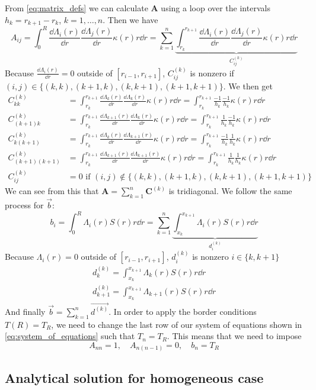 From \autoref{eq:matrix_defs} we can calculate \(\mathbf{A}\) using a loop over the intervals \(h_k = r_{k+1} - r_k\), \(k = 1, \dots, n\). Then we have
\begin{equation}
    A_{ij}
    = \int_0^R \frac{\dd \Lambda_i(r)}{\dd r} \frac{\dd \Lambda_j(r)}{\dd r} \kappa(r) r \dd r
    = \sum_{k=1}^n \underbrace{\int_{r_k}^{r_{k+1}} \frac{\dd \Lambda_i(r)}{\dd r} \frac{\dd \Lambda_j(r)}{\dd r} \kappa(r) r \dd r}_{C_{ij}^{(k)}}
\end{equation}
Because \(\frac{\dd \Lambda_i(r)}{\dd r} = 0\) outside of \([r_{i-1}, r_{i+1}]\), \(C^{(k)}_{ij}\) is nonzero if \((i,j) \in \{(k,k), (k+1,k), (k,k+1), (k+1,k+1)\}\). We then get
\begin{align*}
    C^{(k)}_{kk} &= \int_{r_{k}}^{r_{k+1}} \frac{\dd \Lambda_{k}(r)}{\dd r} \frac{\dd \Lambda_{k}(r)}{\dd r} \kappa(r) r \dd r = \int_{r_{k}}^{r_{k+1}} \frac{-1}{h_k} \frac{-1}{h_k} \kappa(r) r \dd r \\
    C^{(k)}_{(k+1)k} &= \int_{r_{k}}^{r_{k+1}} \frac{\dd \Lambda_{k+1}(r)}{\dd r} \frac{\dd \Lambda_{k}(r)}{\dd r} \kappa(r) r \dd r = \int_{r_{k}}^{r_{k+1}} \frac{1}{h_k} \frac{-1}{h_k} \kappa(r) r \dd r \\
    C^{(k)}_{k(k+1)} &= \int_{r_{k}}^{r_{k+1}} \frac{\dd \Lambda_{k}(r)}{\dd r} \frac{\dd \Lambda_{k+1}(r)}{\dd r} \kappa(r) r \dd r = \int_{r_{k}}^{r_{k+1}} \frac{-1}{h_k} \frac{1}{h_k} \kappa(r) r \dd r \\
    C^{(k)}_{(k+1)(k+1)} &= \int_{r_{k}}^{r_{k+1}} \frac{\dd \Lambda_{k+1}(r)}{\dd r} \frac{\dd \Lambda_{k+1}(r)}{\dd r} \kappa(r) r \dd r = \int_{r_{k}}^{r_{k+1}} \frac{1}{h_k} \frac{1}{h_k} \kappa(r) r \dd r \\
    C^{(k)}_{ij} &= 0 \textrm{ if } (i,j) \notin \{(k,k), (k+1,k), (k,k+1), (k+1,k+1)\}
\end{align*}
We can see from this that \(\mathbf{A} = \sum_{k=1}^{n} \mathbf{C}^{(k)}\) is tridiagonal. We follow the same process for \(\vec{b}\):
\begin{equation}
    b_i = \int_0^R \Lambda_i(r) S(r) r \dd r = \sum_{k=1}^{n} \underbrace{\int_{x_k}^{x_{k+1}} \Lambda_i(r) S(r) r \dd r}_{d^{(k)}_i}
\end{equation}
Because \(\Lambda_i(r) = 0\) outside of \([r_{i-1}, r_{i+1}]\), \(d^{(k)}_i\) is nonzero \(i \in \{k, k+1\}\)
\begin{align*}
    d^{(k)}_k = \int_{x_k}^{x_{k+1}} \Lambda_k(r) S(r) r \dd r \\
    d^{(k)}_{k+1} = \int_{x_k}^{x_{k+1}} \Lambda_{k+1}(r) S(r) r \dd r
\end{align*}
And finally \(\vec{b} = \sum_{k=1}^{n} \overrightarrow{d^{(k)}}\). In order to apply the border conditions \(T(R) = T_R\), we need to change the last row of our system of equations shown in \autoref{eq:system_of_equations} such that \(T_n = T_R\). This means that we need to impose
\begin{equation}
    A_{nn} = 1, \quad A_{n(n-1)} = 0, \quad b_n = T_R
\end{equation}

\subsection{Analytical solution for homogeneous case}
\label{sec:solution_anal}
